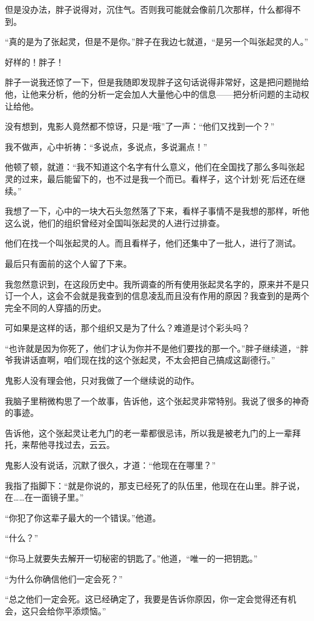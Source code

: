 但是没办法，胖子说得对，沉住气。否则我可能就会像前几次那样，什么都得不到。

“真的是为了张起灵，但是不是你。”胖子在我边七就道，“是另一个叫张起灵的人。”

好样的！胖子！

胖子一说我还惊了一下，但是我随即发现胖子这句话说得非常好，这是把问题抛给他，让他来分析，他的分析一定会加人大量他心中的信息——把分析问题的主动权让给他。

没有想到，鬼影人竟然都不惊讶，只是“哦”了一声：“他们又找到一个？”

我不做声，心中祈祷：“多说点，多说点，多说漏点！”

他顿了顿，就道：“我不知道这个名字有什么意义，他们在全国找了那么多叫张起灵的过来，最后能留下的，也不过是我一个而已。看样子，这个计划‘死’后还在继续。”

我想了一下，心中的一块大石头忽然落了下来，看样子事情不是我想的那样，听他这么说，他们的组织曾经对全国叫张起灵的人进行过排查。

他们在找一个叫张起灵的人。而且看样子，他们还集中了一批人，进行了测试。

最后只有面前的这个人留了下来。

我忽然意识到，在这段历史中。我所调查的所有使用张起灵名字的，原来并不是只订一个人，这会不会就是我查到的信息凌乱而且没有作用的原因？我查到的是两个完全不同的人穿插的历史。

可如果是这样的话，那个组织又是为了什么？难道是讨个彩头吗？

“也许就是因为你死了，他们才认为你并不是他们要找的那一个。”胖子继续道，“胖爷我讲话直啊，咱们现在找的这个张起灵，不太会把自己搞成这副德行。”

鬼影人没有理会他，只对我做了一个继续说的动作。

我脑子里稍微构思了一个故事，告诉他，这个张起灵非常特别。我说了很多的神奇的事迹。

告诉他，这个张起灵让老九门的老一辈都很忌讳，所以我是被老九门的上一辈拜托，来帮他寻找过去，云云。

鬼影人没有说话，沉默了很久，才道：“他现在在哪里？”

我指了指脚下：“就是你说的，那支已经死了的队伍里，他现在在山里。胖子说，在……在一面镜子里。”

“你犯了你这辈子最大的一个错误。”他道。

“什么？”

“你马上就要失去解开一切秘密的钥匙了。”他道，“唯一的一把钥匙。”

“为什么你确信他们一定会死？”

“总之他们一定会死。这已经确定了，我要是告诉你原因，你一定会觉得还有机会，这只会给你平添烦恼。”


